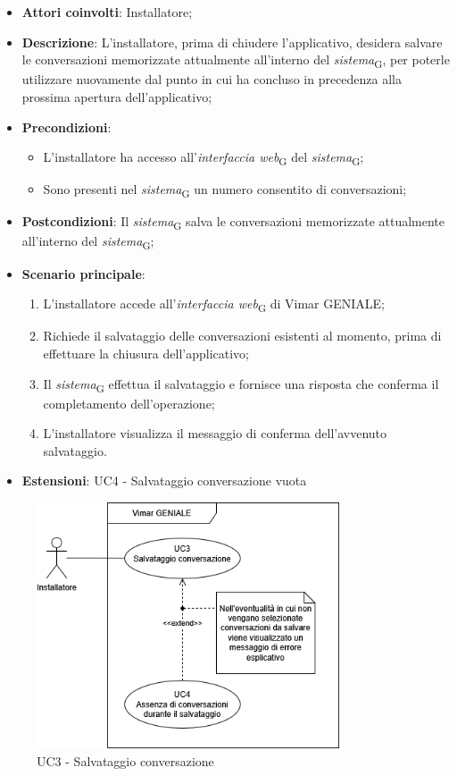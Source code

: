 \begin{itemize}
    \item \textbf{Attori coinvolti}: Installatore;
    \item \textbf{Descrizione}: L’installatore, prima di chiudere l’applicativo, desidera salvare le conversazioni memorizzate attualmente all’interno del \textit{sistema}\textsubscript{G}, per poterle utilizzare nuovamente dal punto in cui ha concluso in precedenza alla prossima apertura dell’applicativo;
    \item \textbf{Precondizioni}: 
        \begin{itemize}
            \item L’installatore ha accesso all’\textit{interfaccia web}\textsubscript{G} del \textit{sistema}\textsubscript{G};
            \item Sono presenti nel \textit{sistema}\textsubscript{G} un numero consentito di conversazioni;
        \end{itemize}
    \item \textbf{Postcondizioni}: Il \textit{sistema}\textsubscript{G} salva le conversazioni memorizzate attualmente all’interno del \textit{sistema}\textsubscript{G};
    \item \textbf{Scenario principale}:
    \begin{enumerate}
    \item L’installatore accede all’\textit{interfaccia web}\textsubscript{G} di Vimar GENIALE;
    \item Richiede il salvataggio delle conversazioni esistenti al momento, prima di effettuare la chiusura dell’applicativo;
    \item Il \textit{sistema}\textsubscript{G} effettua il salvataggio e fornisce una risposta che conferma il completamento dell’operazione;
    \item L’installatore visualizza il messaggio di conferma dell’avvenuto salvataggio.
    \end{enumerate}
    \item \textbf{Estensioni}: UC4 - Salvataggio conversazione vuota
\end{itemize}
\begin{figure}[H]
\centering
\includegraphics[width=0.8\textwidth]{contents/casi_duso/png/UC3.png}
\caption{UC3 - Salvataggio conversazione}
\end{figure}

